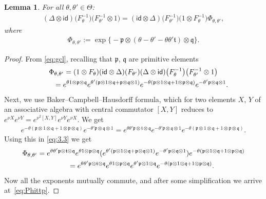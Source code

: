 \documentclass[pdftex]{sigma}
\numberwithin{equation}{section}
\newtheorem{lem}[thm]{Lemma}
\theoremstyle{definition}
\newcommand{\id}{\mathsf{id}}
\newcommand{\mf}{\mathfrak}
\newcommand{\ga}{\mf{p}}
\newcommand{\gb}{\mf{q}}
\newcommand{\gc}{\mf{t}}
\renewcommand{\hbar}{\nu}
\begin{document}
\begin{lem}\label{gcl}
For all $\theta,\theta'\in\Theta$:
\begin{gather}\label{eq:gcl}
(\Delta\otimes\id)\big(F_\theta^{-1}\big)\big(F_{\theta'}^{-1}\otimes 1\big)
=(\id\otimes\Delta)\big(F_{\theta'}^{-1}\big)\big(1\otimes F_\theta^{-1}\big)\Phi_{\theta,\theta'},
\end{gather}
where
\begin{gather}\label{eq:Phittp}
\Phi_{\theta,\theta'}:=\exp\big\{{-}\ga\otimes\left(\theta-\theta'-\theta\theta' \gc\right)\otimes\gb\big\} .
\end{gather}
\end{lem}

\begin{proof}
From \eqref{eq:gcl}, recalling that $\ga$, $\gb$ are primitive elements
\begin{gather}
\Phi_{\theta,\theta'} =
(1\otimes F_\theta)
(\id\otimes\Delta)(F_{\theta'})(\Delta\otimes\id)\big(F_\theta^{-1}\big)\big(F_{\theta'}^{-1}\otimes 1\big) \nonumber \\
\hphantom{\Phi_{\theta,\theta'} }{}
=e^{\theta 1\otimes \ga\otimes\gb}
e^{\theta'( \ga\otimes 1\otimes\gb+\ga\otimes\gb\otimes 1 )}
e^{-\theta ( \ga\otimes 1\otimes\gb+1\otimes\ga\otimes\gb)}
e^{-\theta' \ga\otimes\gb\otimes 1} . \label{eq:3.3}
\end{gather}
Next, we use Baker--Campbell--Hausdorf\/f formula, which for two elements $X$, $Y$ of an associative algebra with central commutator $[X,Y]$ reduces to $e^{\hbar X}e^{\hbar Y}=e^{\hbar^2[X,Y]}e^{\hbar Y}e^{\hbar X}$. We get
\begin{gather*}
e^{-\theta ( \ga\otimes 1\otimes\gb+1\otimes\ga\otimes\gb)}
e^{-\theta' \ga\otimes\gb\otimes 1}=
e^{\theta\theta' \ga\otimes\gc\otimes\gb}
e^{-\theta' \ga\otimes\gb\otimes 1}
e^{-\theta ( \ga\otimes 1\otimes\gb+1\otimes\ga\otimes\gb)} .
\end{gather*}
Using this in \eqref{eq:3.3} we get
\begin{gather*}
\Phi_{\theta,\theta'} =
e^{\theta\theta' \ga\otimes\gc\otimes\gb}
e^{\theta 1\otimes \ga\otimes\gb}
 (e^{\theta'( \ga\otimes 1\otimes\gb+\ga\otimes\gb\otimes 1 )}
e^{-\theta' \ga\otimes\gb\otimes 1})
e^{-\theta ( \ga\otimes 1\otimes\gb+1\otimes\ga\otimes\gb)} \\
\hphantom{\Phi_{\theta,\theta'} }{}
=e^{\theta\theta' \ga\otimes\gc\otimes\gb}
e^{\theta 1\otimes \ga\otimes\gb}
e^{\theta' \ga\otimes 1\otimes \gb}
e^{-\theta ( \ga\otimes 1\otimes\gb+1\otimes\ga\otimes\gb)} .
\end{gather*}
Now all the exponents mutually commute, and after some simplif\/ication we arrive at~\eqref{eq:Phittp}.
\end{proof}
\end{document}

